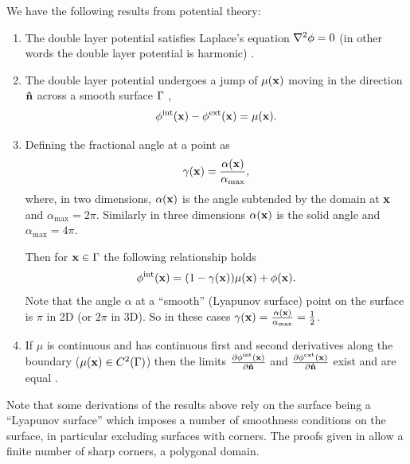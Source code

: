 We have the following results from potential theory:
\begin{enumerate}
\item The double layer potential satisfies Laplace's equation $\nabla^2 \phi = 0$ (in other words the double layer potential is harmonic) \cite{Sternberg1946}.

\item The double layer potential undergoes a jump of $\mu(\boldsymbol{\mathrm{x}})$ moving in the direction $\boldsymbol{\mathrm{\hat{n}}}$ across a smooth surface ${\Gamma}$ \cite[136-140]{Sternberg1946}, \ie
  \begin{equation}
    \label{eq:15}
    \phi^{\mathrm{int}}(\boldsymbol{\mathrm{x}}) - \phi^{\mathrm{ext}}(\boldsymbol{\mathrm{x}}) = \mu(\boldsymbol{\mathrm{x}}).
  \end{equation}

\item Defining the fractional angle at a point as
  \begin{equation}
    \gamma(\boldsymbol{\mathrm{x}}) = \frac{\alpha(\boldsymbol{\mathrm{x}})}{\alpha_{\text{max}}},
  \end{equation}
  where, in two dimensions, $\alpha(\boldsymbol{\mathrm{x}})$ is the angle subtended by the domain at $\boldsymbol{\mathrm{x}}$ and $\alpha_{\text{max}} = 2\pi$.
  Similarly in three dimensions $\alpha(\boldsymbol{\mathrm{x}})$ is the solid angle and $\alpha_{\text{max}} = 4\pi$.

  Then for $\boldsymbol{\mathrm{x}} \in {\Gamma}$ the following relationship holds \cite[137-139, 155]{Sternberg1946}
  \begin{equation}
    \phi^{\mathrm{int}}(\boldsymbol{\mathrm{x}}) = (1 - \gamma(\boldsymbol{\mathrm{x}})) \mu(\boldsymbol{\mathrm{x}}) + \phi(\boldsymbol{\mathrm{x}}).
    \label{eq:22}
  \end{equation}
  Note that the angle $\alpha$ at a ``smooth'' (\ie Lyapunov surface) point on the surface is $\pi$ in 2D (or $2\pi$ in 3D).
  So in these cases $\gamma(\boldsymbol{\mathrm{x}}) = \frac{\alpha(\boldsymbol{\mathrm{x}})}{\alpha_{\text{max}}} = \frac{1}{2}$.

\item If $\mu$ is continuous and has continuous first and second derivatives along the boundary (\ie $\mu(\boldsymbol{\mathrm{x}}) \in C^2({\Gamma})$) then the limits $\frac{\partial \phi^{\mathrm{int}}(\boldsymbol{\mathrm{x}})}{\partial \boldsymbol{\mathrm{\hat{n}}}}$ and $\frac{\partial \phi^{\mathrm{ext}}(\boldsymbol{\mathrm{x}})}{\partial \boldsymbol{\mathrm{\hat{n}}}}$ exist and are equal \cite[145-153]{Sternberg1946}.

\end{enumerate}

Note that some derivations of the results above rely on the surface being a ``Lyapunov surface'' which imposes a number of smoothness conditions on the surface, in particular excluding surfaces with corners.
The proofs given in \cite{Sternberg1946} allow a finite number of sharp corners, \ie a polygonal domain.

